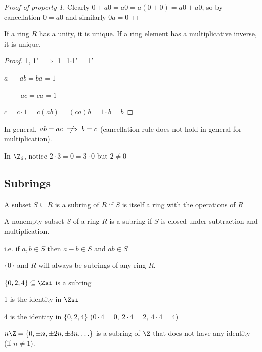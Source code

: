 \begin{proof}[Proof of property 1]
    Clearly \(0+a0 = a0 = a(0+0) = a0 + a0\), so by cancellation \(0=a0\) and similarly \(0a=0\)
\end{proof}

\begin{theorem}
  If a ring \(R\) has a unity, it is unique. If a ring element has a multiplicative inverse, it is unique.
\end{theorem}

\begin{proof}
1, 1' \(\implies\) 1=1\(\cdot\)1' = 1'

\(a\) \(\quad\) \(ab=ba = 1\)

\(\qquad\) \(ac=ca=1\)

\(c = c\cdot 1 = c(ab) = (ca)b = 1\cdot b = b\)
\end{proof}

\begin{warning}
In general, \(ab = ac \centernot\implies b=c\) (cancellation rule does not hold in general for multiplication).
\end{warning}

\begin{example}
  In \(\Z_6\), notice \(2\cdot 3 = 0 = 3\cdot 0\) but \(2\neq 0\)
\end{example}

\subsection{Subrings}

\begin{definition}[Subring]
  A subset \(S\subseteq R\) is a \uline{subring} of \(R\) if \(S\) is itself a ring with the operations of \(R\)
\end{definition}

\begin{theorem}
  A nonempty subset \(S\) of a ring \(R\) is a subring if \(S\)  is closed under subtraction and multiplication.

  i.e. if \(a,b\in S\) then \(a-b\in S\) and \(ab \in S\)
\end{theorem}

\begin{example}
  \(\{0\}\) and \(R\) will always be subrings of any ring \(R\).
\end{example}

\begin{example}
  \(\{0,2,4\}\subseteq \Zsi\) is a subring

  1 is the identity in \(\Zsi\)

  4 is the identity in \(\{0,2,4\}\) (\(0\cdot 4 = 0,\ 2\cdot 4 = 2,\ 4\cdot 4 = 4\))
\end{example}

\begin{example}
  \(n\Z = \{0, \pm n, \pm 2n, \pm 3n,\ldots\}\) is a subring of \(\Z\) that does not have any identity (if \(n\neq 1\)).
\end{example}